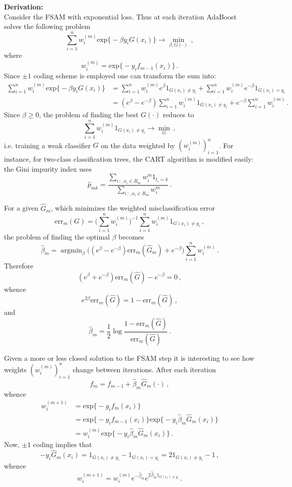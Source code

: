 \documentclass[a4paper]{article}
\newcommand{\argmin}{\mathop{\text{argmin}}}
\begin{document}
\noindent\textbf{Derivation:}\hfill\\
Consider the FSAM with exponential loss. Thus at each iteration AdaBoost solves
the following problem 
\[
\sum_{i=1}^n w_i^{(m)} \text{exp}\bigl\{ -\beta y_i G(x_i) \bigr\}
\to \min_{\beta,G(\cdot)}\,,
\]
where 
\[ w_i^{(m)} = \text{exp}\bigl\{ -y_i f_{m-1}(x_i) \bigr\}\,. \]
Since $\pm1$ coding scheme is employed one can transform the sum into:
\begin{align*}
	\sum_{i=1}^n w_i^{(m)} \text{exp}\bigl\{ -\beta y_i G(x_i) \bigr\}
	&= \sum_{i=1}^n w_i^{(m)} e^\beta 1_{G(x_i) \neq y_i}
		+ \sum_{i=1}^n w_i^{(m)} e^{-\beta} 1_{G(x_i) = y_i} \\
	&= (e^\beta-e^{-\beta}) \sum_{i=1}^n w_i^{(m)} 1_{G(x_i) \neq y_i}
		+ e^{-\beta} \sum_{i=1}^n w_i^{(m)} \,.
\end{align*}
Since $\beta \geq 0$, the problem of finding the best $G(\cdot)$ reduces to
\[ \sum_{i=1}^n w_i^{(m)} 1_{G(x_i) \neq y_i} \to \min_G\,, \]
i.e. training a weak classifier $G$ on the data weighted by $(w_i^{(m)})_{i=1}^n$.
For instance, for two-class classification trees, the CART algorithm is modified
easily: the Gini impurity index uses
\[
\hat{p}_{mk}
 = \frac{ \sum_{i\,:,x_i\in R_m} w^m_i 1_{t_i=k} }
 	{ \sum_{i\,:,x_i\in R_m} w^m_i } \,.
\]

For a given $\hat{G}_m$, which minimizes the weighted misclassification error
\[
\text{err}_m(G)
= \bigl(\sum_{i=1}^n w_i^{(m)}\bigr)^{-1}
	\sum_{i=1}^n w_i^{(m)} 1_{G(x_i) \neq y_i} \,,
\]
the problem of finding the optimal $\beta$ becomes
\[
\hat{\beta}_m = \argmin_\beta
	\bigl( (e^\beta-e^{-\beta}) \text{err}_m(\hat{G}_m) + e^{-\beta} \bigr)
		\sum_{i=1}^n w_i^{(m)} \,.
\]
Therefore 
\[ (e^\beta+e^{-\beta}) \text{err}_m(\hat{G}) - e^{-\beta} = 0\,, \]
whence
\[ e^{2\beta} \text{err}_m(\hat{G}) = 1 - \text{err}_m(\hat{G}) \,, \]
and
\[
\hat{\beta}_m = \frac{1}{2} \log \frac{1-\text{err}_m(\hat{G})}{\text{err}_m(\hat{G})}\,.
\]

Given a more or less closed solution to the FSAM step it is interesting to see
how weights $(w_i^{(m)})_{i=1}^n$ change between iterations. After each iteration
\[ f_m = f_{m-1} + \hat{\beta}_m \hat{G}_m(\cdot)\,, \]
whence
\begin{align*}
	w_i^{(m+1)}
	&= \text{exp}\bigl\{ -y_i f_m(x_i) \bigr\} \\
	&= \text{exp}\bigl\{ -y_i f_{m-1}(x_i) \bigr\}
	   \text{exp}\bigl\{ -y_i \hat{\beta}_m \hat{G}_m(x_i) \bigr\}\\
	&= w_i^{(m)}
	   \text{exp}\bigl\{ -y_i \hat{\beta}_m \hat{G}_m(x_i) \bigr\}\,.
\end{align*}
Now, $\pm1$ coding implies that
\[
- y_i \hat{G}_m(x_i)
= 1_{G(x_i) \neq y_i} - 1_{G(x_i) = y_i}
= 2 1_{G(x_i) \neq y_i} - 1\,,
\]
whence
\[ w_i^{(m+1)} = w_i^{(m)} e^{-\hat{\beta}_m} e^{ 2 \hat{\beta}_m 1_{G(x_i) \neq y_i}} \,. \]
\end{document}
